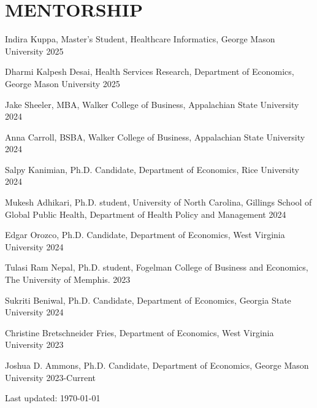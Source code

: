 \section*{MENTORSHIP}
\begin{list1}
\item[] Indira Kuppa, Master's Student, Healthcare Informatics, George Mason University \hfill 2025
\item[] Dharmi Kalpesh Desai, Health Services Research, Department of Economics, George Mason University \hfill 2025
\item[] Jake Sheeler, MBA, Walker College of Business, Appalachian State University \hfill 2024
\item[] Anna Carroll, BSBA, Walker College of Business, Appalachian State University \hfill 2024
\item[] Salpy Kanimian, Ph.D. Candidate, Department of Economics, Rice University \hfill 2024
\item[] Mukesh Adhikari, Ph.D. student, University of North Carolina, Gillings School of Global Public Health, Department of Health Policy and Management \hfill 2024
\item[] Edgar Orozco, Ph.D. Candidate, Department of Economics, West Virginia University \hfill 2024
\item[] Tulasi Ram Nepal, Ph.D. student, Fogelman College of Business and Economics, The University of Memphis. \hfill 2023
\item[] Sukriti Beniwal, Ph.D. Candidate, Department of Economics, Georgia State University \hfill 2024
\item[] Christine Bretschneider Fries, Department of Economics, West Virginia University \hfill 2023
\item[] Joshua D. Ammons, Ph.D. Candidate, Department of Economics, George Mason University \hfill 2023-Current
\end{list1}


\bigskip 
\begin{center}
 \begin{footnotesize}
 Last updated: \today \\
 \href{\footerlink}{\texttt{\footerlink}}
 \end{footnotesize}
\end{center}